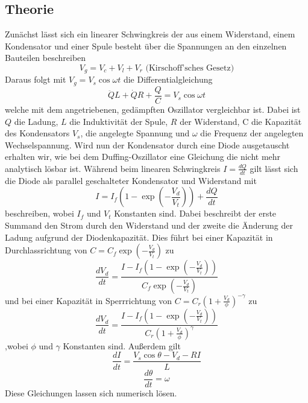 \documentclass{scrartcl}
\begin{document}
\subsection { Theorie } \label{ssec:theo}
Zunächst lässt sich ein linearer Schwingkreis der aus einem Widerstand, einem Kondensator und einer Spule besteht über die Spannungen an den einzelnen Bauteilen beschreiben
$$V_g=V_c+V_l+V_r \text{ (Kirschoff'sches Gesetz)}$$
Daraus folgt mit $V_g=V_s\cos{\omega t}$ die Differentialgleichung
$$\ddot{Q}L + \dot{Q}R+ \frac{Q}{C} = V_s\cos{\omega t}$$
welche mit dem angetriebenen, gedämpften Oszillator vergleichbar ist. Dabei ist $Q$ die Ladung, $L$ die Induktivität der Spule, $R$ der Widerstand, C die Kapazität des Kondensators $V_s$, die angelegte Spannung und $\omega$ die Frequenz der angelegten Wechselspannung.
\newline
Wird nun der Kondensator durch eine Diode ausgetauscht erhalten wir, wie bei dem Duffing-Oszillator eine Gleichung die nicht mehr analytisch lösbar ist. Während beim linearen Schwingkreis $I=\frac{dQ}{dt}$ gilt lässt sich die Diode als parallel geschalteter Kondensator und Widerstand mit 
\begin{equation}I=I_f(1-\exp(-\frac{V_d}{V_t})) + \frac{dQ}{dt}\end{equation}
beschreiben, wobei $I_f$ und $V_t$ Konstanten sind. Dabei beschreibt der erste Summand den Strom durch den Widerstand und der zweite die Änderung der Ladung aufgrund der Diodenkapazität. 
Dies führt bei einer Kapazität in Durchlassrichtung von $C=C_f\exp(-\frac{V_d}{V_t})$ zu
\begin{equation}\frac{dV_d}{dt}= \frac{I-I_f(1-\exp(-\frac{V_d}{V_t}))}{C_f\exp(-\frac{V_d}{V_t})} \end{equation}
und bei einer Kapazität in Sperrrichtung von $C=C_r(1+\frac{V_d}{\phi})^{-\gamma}$ zu
\begin{equation}
\frac{dV_d}{dt}= \frac{I-I_f(1-\exp(-\frac{V_d}{V_t}))}{C_r(1+\frac{V_d}{\phi})^{\gamma}}
\end{equation}
,wobei $\phi$ und $\gamma$ Konstanten sind.
Außerdem gilt
\begin{equation}\frac{dI}{dt}=\frac{V_s \cos{\theta} - V_d - RI}{L}\end{equation}
\begin{equation}\frac{d\theta}{dt}=\omega\end{equation}
Diese Gleichungen lassen sich numerisch lösen.
\end{document}

